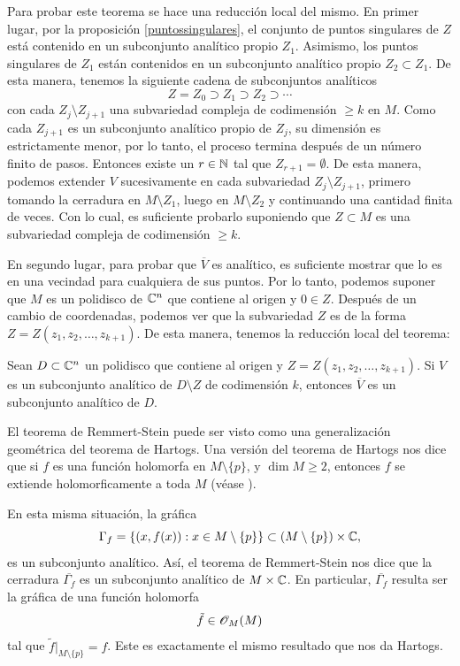 		Para probar este teorema se hace una reducción local del mismo. En primer lugar, por la proposición \ref{puntossingulares}, el conjunto de puntos singulares de $Z$ está contenido en un subconjunto analítico propio $Z_1$. Asimismo, los puntos singulares de $Z_1$ están contenidos en un subconjunto analítico propio $Z_2\subset Z_1$. De esta manera, tenemos la siguiente cadena de subconjuntos analíticos
		\begin{equation*}
			Z=Z_0\supset Z_1 \supset Z_2 \supset \cdots 
		\end{equation*}
		con cada $Z_j\setminus Z_{j+1}$ una subvariedad compleja de codimensión $\geq k$ en $M$. Como cada $Z_{j+1}$ es un subconjunto analítico propio de $Z_j$, su dimensión es estrictamente menor, por lo tanto, el proceso termina después de un número finito de pasos. Entonces existe un $r\in\mathbb{N}$ tal que $Z_{r+1}=\emptyset$. De esta manera, podemos extender $V$ sucesivamente en cada subvariedad $Z_{j}\setminus Z_{j+1}$, primero tomando la cerradura en $M\setminus Z_{1}$, luego en $M\setminus Z_2$ y continuando una cantidad finita de veces. Con lo cual, es suficiente probarlo suponiendo que $Z\subset M$ es una subvariedad compleja de codimensión $\geq k$.
		
		En segundo lugar, para probar que $\overline{V}$ es analítico, es suficiente mostrar que lo es en una vecindad para cualquiera de sus puntos. Por lo tanto, podemos suponer que $M$ es un polidisco de $\mathbb{C}^n$ que contiene al origen y $0\in Z$. Después de un cambio de coordenadas,  podemos ver que la subvariedad $Z$ es de la forma $Z=Z(z_1,z_2,\dots,z_{k+1})$. De esta manera, tenemos la reducción local del teorema:
		
		\begin{propo}
			Sean $D\subset\mathbb{C}^n$ un polidisco que contiene al origen y $Z=Z(z_1,z_2,\dots,z_{k+1})$. Si $V$ es un subconjunto analítico de $D\setminus Z$ de codimensión $k$, entonces $\overline{V}$ es un subconjunto analítico de $D$.
		\end{propo}
		
		\begin{remark}
			El teorema de Remmert-Stein puede ser visto como una generalización geométrica del teorema de Hartogs. Una versión del teorema de Hartogs nos dice que si $f$ es una función holomorfa en $M\setminus\{p\}$, y $\dim M\geq 2$, entonces $f$ se extiende holomorficamente a toda $M$ (véase \parencite[Chap. 2, Sec. 1, Cor. 2.1.6]{huybrechts2005complex}).
			
			En esta misma situación, la gráfica
			\begin{equation*}
				\Gamma_f=\{(x,f(x)):x\in M\setminus \{p\}\}\subset (M\setminus \{p\})\times \mathbb{C},
			\end{equation*}
			es un subconjunto analítico. Así, el teorema de Remmert-Stein nos dice que la cerradura $\overline{\Gamma_f}$ es un subconjunto analítico de $M\times \mathbb{C}$. En particular, $\overline{\Gamma_f}$ resulta ser la gráfica de una función holomorfa
			\begin{equation*}
				\tilde{f}\in\mathscr{O}_M(M)
			\end{equation*}
			tal que $\tilde{f}|_{M\setminus\{p\}}=f$. Este es exactamente el mismo resultado que nos da Hartogs. 
		\end{remark}
		

